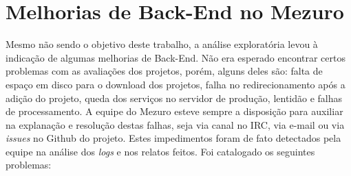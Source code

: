 \section{Melhorias de Back-End no Mezuro}

Mesmo não sendo o objetivo deste trabalho, a análise exploratória levou à
indicação de algumas melhorias de Back-End. Não era esperado encontrar certos
problemas com as avaliações dos projetos, porém, alguns deles
são: falta de espaço em disco para o download dos projetos, falha no
redirecionamento após a adição do projeto, queda dos serviços no servidor de
produção, lentidão e falhas de processamento. A equipe do Mezuro
esteve sempre a disposição para auxiliar na explanação e resolução destas
falhas, seja via canal no IRC, via e-mail ou via \textit{issues} no Github do
projeto. Estes impedimentos foram de fato detectados pela equipe na análise dos
\textit{logs} e nos relatos feitos. Foi catalogado os seguintes problemas:

